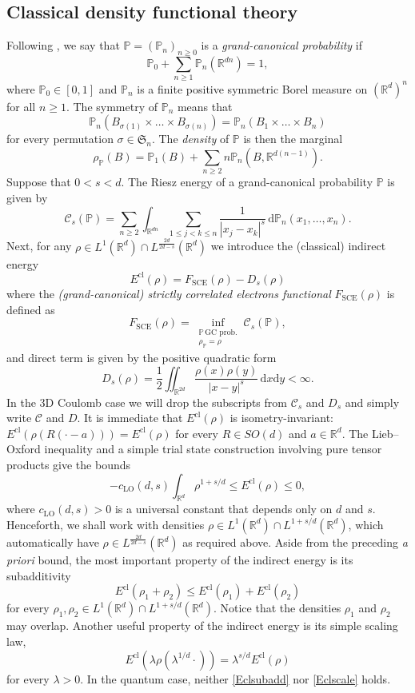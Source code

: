 \documentclass[final,onefignum,onetabnum,reqno]{amsart}
\theoremstyle{remark}
\renewcommand{\le}{\leqslant}
\renewcommand{\ge}{\geqslant}
\newcommand{\RR}{\mathbb{R}}
\newcommand{\PP}{\mathbb{P}}
\newcommand{\cl}{\mathrm{cl}} %
\newcommand{\LO}{\mathrm{LO}} %
\newcommand{\SCE}{\mathrm{SCE}} %
\newcommand{\dd}{\mathrm{d}} %
\newcommand{\Cc}{\mathcal{C}}
\newcommand{\SF}{\mathfrak{S}}
\begin{document}
\subsection{Classical density functional theory}
Following \cite{di2025grand}, we say that $\PP=(\PP_n)_{n\ge 0}$ is a \emph{grand-canonical probability} if 
$$
\PP_0 + \sum_{n\ge 1} \PP_n(\RR^{dn})=1,
$$
where $\PP_0\in[0,1]$ and $\PP_n$ is a finite positive symmetric Borel measure on $(\RR^d)^n$ for all $n\ge 1$. The symmetry of $\PP_n$ means that 
$$
\PP_n(B_{\sigma(1)}\times\ldots \times B_{\sigma(n)})=\PP_n(B_1\times\ldots\times B_n)
$$
for every permutation $\sigma\in\SF_n$.
The \emph{density} of $\PP$ is then the marginal
$$
\rho_\PP(B)=\PP_1(B) + \sum_{n\ge 2} n\PP_n(B,\RR^{d(n-1)}).
$$
Suppose that $0<s<d$. The Riesz energy of a grand-canonical probability $\PP$ is given by 
$$
\Cc_s(\PP)=\sum_{n\ge 2}\int_{\RR^{dn}} \sum_{1\le j<k\le n}\frac{1}{|x_j-x_k|^s}\, \dd\PP_n(x_1,\ldots,x_n).
$$
Next, for any $\rho\in L^1(\RR^d)\cap L^{\frac{2d}{2d-s}}(\RR^d)$ we introduce the (classical) indirect energy 
$$
\boxed{E^\cl(\rho)=F_\SCE(\rho)-D_s(\rho)}
$$
where the \emph{(grand-canonical) strictly correlated electrons functional} $F_\SCE(\rho)$ is defined
as
$$
F_\SCE(\rho)=\inf_{\substack{\PP\,\text{GC prob.}\\\rho_\PP=\rho}} \Cc_s(\PP),
$$
and direct term is given by the positive quadratic form
$$
D_s(\rho)=\frac{1}{2}\iint_{\RR^{2d}} \frac{\rho(x)\rho(y)}{|x-y|^s}\,\dd x\dd y<\infty.
$$
In the 3D Coulomb case we will drop the subscripts from $\Cc_s$ and $D_s$ and simply write $\Cc$ and $D$. 
It is immediate that $E^\cl(\rho)$ is isometry-invariant: $E^\cl(\rho(R(\cdot-a)))=E^\cl(\rho)$ for every $R\in SO(d)$ and $a\in\RR^d$. 
The Lieb--Oxford inequality and a simple trial state construction involving pure tensor products give the bounds
\begin{equation}\label{Eclapriori}
-c_\LO(d,s) \int_{\RR^d} \rho^{1+s/d}\le  E^\cl(\rho)\le 0,
\end{equation}
where $c_\LO(d,s)>0$ is a universal constant that depends only on $d$ and $s$. 
Henceforth, we shall work with densities $\rho\in L^1(\RR^d)\cap L^{1+s/d}(\RR^d)$, which automatically have $\rho\in L^{\frac{2d}{2d-s}}(\RR^d)$ as required above. 
Aside from the preceding \emph{a priori} bound, the most important property of the indirect energy is its subadditivity
\begin{equation}\label{Eclsubadd}
E^\cl(\rho_1+\rho_2)\le E^\cl(\rho_1) + E^\cl(\rho_2)
\end{equation}
for every $\rho_1,\rho_2\in L^1(\RR^d)\cap L^{1+s/d}(\RR^d)$. Notice that the densities $\rho_1$ and $\rho_2$ may overlap. 
Another useful property of the indirect energy is its simple scaling law,
\begin{equation}\label{Eclscale}
E^\cl(\lambda\rho(\lambda^{1/d}\cdot)) = \lambda^{s/d} E^\cl(\rho)
\end{equation}
for every $\lambda>0$. In the quantum case, neither \cref{Eclsubadd} nor \cref{Eclscale} holds. 
\end{document}
